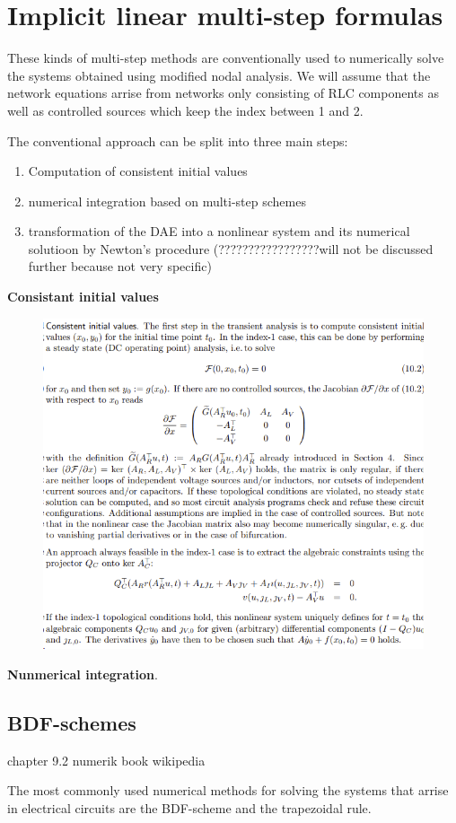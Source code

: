 \section{Implicit linear multi-step formulas}
These kinds of multi-step methods are conventionally used to numerically solve the systems obtained using modified nodal analysis. We will assume that the network equations arrise from networks only consisting of RLC components as well as controlled sources which keep the index between 1 and 2.

The conventional approach can be split into three main steps:
\begin{enumerate}
	\item Computation of consistent initial values
	\item numerical integration based on multi-step schemes
	\item transformation of the DAE into a nonlinear system and its numerical solutioon by Newton's procedure (?????????????????will not be discussed further because not very specific)
\end{enumerate}

\textbf{Consistant initial values} 
\begin{figure}[H]
	\centering
	\includegraphics[width=0.7\linewidth]{screenshot009}
	\caption{}
	\label{fig:screenshot009}
\end{figure}

\textbf{Nunmerical integration}.


\subsection{BDF-schemes}
	chapter 9.2 numerik book
	wikipedia
	
	The most commonly used numerical methods for solving the systems that arrise in electrical circuits are the BDF-scheme and the trapezoidal rule. 
	
